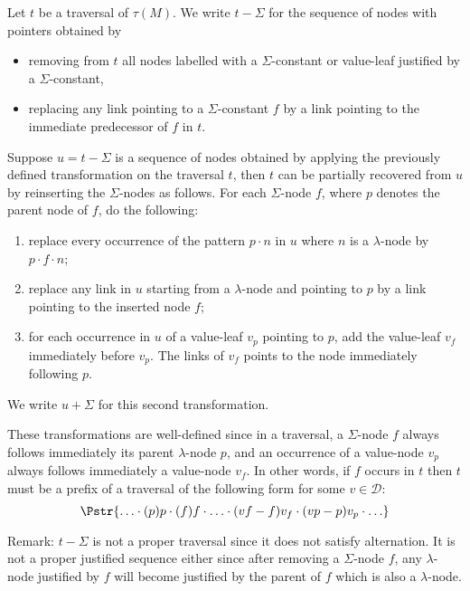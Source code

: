 \begin{definition}
Let $t$ be a traversal of $\tau(M)$. We write $t-\Sigma$ for the
sequence of nodes with pointers obtained by
\begin{itemize}
\item removing from $t$ all nodes labelled with a $\Sigma$-constant or value-leaf justified by a $\Sigma$-constant,
\item replacing any link pointing to a $\Sigma$-constant $f$
by a link pointing to the immediate predecessor of $f$ in $t$.
\end{itemize}

Suppose $u = t-\Sigma$ is a sequence of nodes obtained by applying
the previously defined transformation on the traversal $t$, then $t$
can be partially recovered from $u$ by reinserting the
$\Sigma$-nodes as follows. For each $\Sigma$-node $f$, where $p$
denotes the parent node of $f$, do the following:
    \begin{enumerate}
    \item replace every occurrence of the pattern $p \cdot n$ in $u$ where
    $n$ is a $\lambda$-node by $p \cdot f \cdot n$;

    \item replace any link in $u$ starting from a $\lambda$-node and pointing to $p$ by a link pointing to the inserted node $f$;

    \item for each occurrence in $u$ of a value-leaf $v_p$ pointing to $p$, add the value-leaf $v_f$
    immediately before $v_p$. The links of $v_f$ points to the
    node immediately following $p$.
    \end{enumerate}
We write $u+\Sigma$ for this second transformation.
\end{definition}
These transformations are well-defined since in a traversal, a
$\Sigma$-node $f$ always follows immediately its parent
$\lambda$-node $p$, and an occurrence of a value-node $v_p$ always
follows immediately a value-node $v_f$. In other words, if $f$
occurs in $t$ then $t$ must be a prefix of a traversal of the
following form for some $v \in \mathcal{D}$:
$$ \Pstr{ \ldots \cdot (p){p} \cdot (f){f} \cdot \ldots \cdot (vf-f){v_f} \cdot (vp-p){v_p} \cdot \ldots }$$

Remark: $t-\Sigma$ is not a proper traversal since it does not
satisfy alternation. It is not a proper justified sequence either
since after removing a $\Sigma$-node $f$, any $\lambda$-node
justified by $f$ will become justified by the parent of $f$ which is
also a $\lambda$-node.

